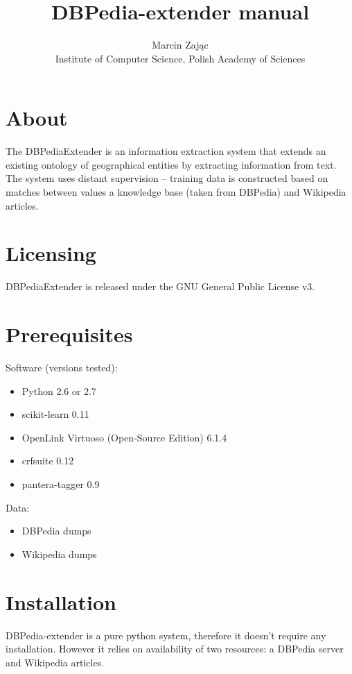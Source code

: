 \documentclass[12pt]{article}
\author{Marcin Zając\\Institute of Computer Science, Polish Academy of Sciences}
\title{DBPedia-extender manual}
\begin{document}
    \maketitle
    \section{About}
    The DBPediaExtender is an information extraction system that extends an existing ontology of geographical entities by extracting information from text. The system uses distant supervision – training data is constructed based on matches between values a knowledge base (taken from DBPedia) and Wikipedia articles.
    
    \section{Licensing}
    DBPediaExtender is released under the GNU General Public License v3.

    \section{Prerequisites}
    Software (versions tested):
    \begin{itemize}
        \item Python 2.6 or 2.7
        \item scikit-learn 0.11
        \item OpenLink Virtuoso (Open-Source Edition) 6.1.4
        \item crfsuite 0.12
        \item pantera-tagger 0.9
    \end{itemize}
    Data:
    \begin{itemize}
        \item DBPedia dumps
        \item Wikipedia dumps
    \end{itemize}
    
    \section{Installation}
    DBPedia-extender is a pure python system, therefore it doesn't require any installation.
    However it relies on availability of two resources: a DBPedia server and Wikipedia articles.
\end{document}
